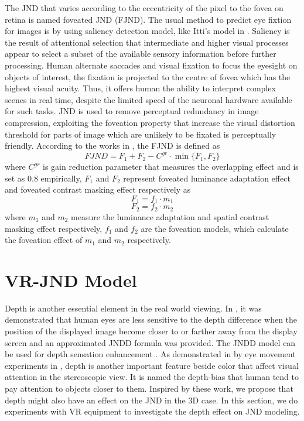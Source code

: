 \documentclass[journal]{IEEEtran}
\begin{document}
The JND that varies according to the eccentricity of the pixel to the fovea on retina is named foveated JND (FJND). The usual method to predict eye fixtion for images is by using saliency detection model, like Itti's model in \cite{RN14}. Saliency is the result of attentional selection that intermediate and higher visual processes appear to select a subset of the available sensory information before further processing.
Human alternate saccades and visual fixation to focus the eyesight on objects of interest, the fixation is projected to the centre of fovea which has the highest visual acuity. Thus, it offers human the ability to interpret complex scenes in real time, despite the limited speed of the neuronal hardware available for such tasks. JND is used to remove perceptual redundancy in image compression, exploiting the foveation property that increase the visual distortion threshold for parts of image which are unlikely to be fixated is perceptually friendly. 
According to the works in \cite{RN635, RN633}, the FJND is defined as
\begin{equation}
FJND=F_1+F_2-C^{gr}\cdot \min \{F_1, F_2 \}
\label{eq1}
\end{equation}
where $C^{gr}$ is gain reduction parameter that measures the overlapping effect and is set as 0.8 empirically, $F_1$ and $F_2$ represent foveated luminance adaptation effect and foveated contrast masking effect respectively as
\begin{equation}
F_1=f_1\cdot m_1
\label{eq2}
\end{equation}
\begin{equation}
F_2=f_2\cdot m_2
\label{eq3}
\end{equation}
where $m_1$ and $m_2$ measure the luminance adaptation and spatial contrast masking effect respectively, $f_1$ and $f_2$ are the foveation models, which calculate the foveation effect of $m_1$ and $m_2$ respectively.

\section{VR-JND Model}
Depth is another essential element in the real world viewing. In \cite{RN636}, it was demonstrated that human eyes are less sensitive to the depth difference when the position of the displayed image become closer to or farther away from the display screen and an approximated JNDD formula was provided. The JNDD model can be used for depth sensation enhancement \cite{RN641}. As demonstrated in by eye movement experiments in \cite{}, depth is another important feature beside color that affect visual attention in the stereoscopic view. It is named the depth-bias that human tend to pay attention to objects closer to them. Inspired by these work, we propose that depth might also have an effect on the JND in the 3D case. In this section, we do experiments with VR equipment to investigate the depth effect on JND modeling. 
\end{document}
